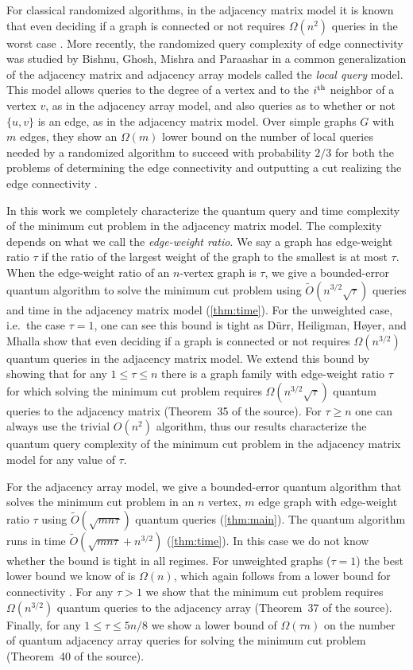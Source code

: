 \documentclass[10pt,a4paper]{article}
\newcommand{\ith}{i^{\scriptsize \mbox{{\rm th}}}}
\newcommand{\tO}{\tilde O}
\newcommand{\1}{\mathbf{1}}
\theoremstyle{definition}
\begin{document}
For classical randomized algorithms, in the adjacency matrix model it is known that even deciding if a graph is connected or not requires $\Omega(n^2)$ queries in the worst case \cite{DHHM06}.
More recently, the randomized query complexity of edge connectivity was studied by Bishnu, Ghosh, Mishra and Paraashar \cite{BGMP20} in a common generalization of the adjacency matrix 
and adjacency array models called the \emph{local query} model.  This model allows queries to the degree of a vertex and to the $\ith$ neighbor of a vertex $v$, 
as in the adjacency array model, and also queries as to whether or not $\{u,v\}$ is an edge, as in the adjacency matrix model.  Over simple graphs $G$ with $m$ edges, they show an 
$\Omega(m)$ lower bound on the number of local queries needed by a randomized algorithm to succeed with probability $2/3$ for both the problems of determining the edge connectivity and 
outputting a cut realizing the edge connectivity \cite[Theorems 2 and 3]{BGMP20}.  

In this work we completely characterize the quantum query and time complexity of the minimum cut problem in the adjacency matrix model.  The complexity depends on what we call 
the \emph{edge-weight ratio}.  We say a graph has edge-weight ratio $\tau$ if the ratio of the largest weight of the graph to the smallest is at most $\tau$.
When the edge-weight ratio of an $n$-vertex graph is $\tau$, we give a bounded-error quantum algorithm to solve the minimum cut problem using $\tilde O(n^{3/2} \sqrt{\tau})$ queries and time 
in the adjacency matrix model (\cref{thm:time}).
For the unweighted case, i.e.\ the case $\tau = 1$, one can see this bound is tight as D\"{u}rr, Heiligman, H{\o}yer, and Mhalla \cite{DHHM06} show that even deciding if a graph is connected or not requires $\Omega(n^{3/2})$ quantum queries 
in the adjacency matrix model.  
We extend this bound by showing that for any $1 \le \tau \le n$ there is a graph family with edge-weight ratio $\tau$ for which solving the minimum cut problem requires $\Omega(n^{3/2} \sqrt{\tau})$ quantum queries to the adjacency matrix 
(Theorem~35 of the source).  For $\tau \ge n$ one can always use the trivial $O(n^2)$ algorithm, thus 
our results characterize the quantum query complexity of the minimum cut problem in the adjacency matrix model for any value of $\tau$.

For the adjacency array model, we give a bounded-error quantum algorithm that solves the minimum cut problem in an $n$ vertex, $m$ edge graph with edge-weight ratio $\tau$ using $\tO(\sqrt{mn\tau})$ quantum queries (\cref{thm:main}).
The quantum algorithm runs in time $\tO(\sqrt{mn\tau} + n^{3/2})$ (\cref{thm:time}).
In this case we do not know whether the bound is tight in all regimes.
For unweighted graphs ($\tau = 1$) the best lower bound we know of is $\Omega(n)$, which again follows from a lower bound for connectivity \cite{DHHM06}.
For any $\tau > 1$ we show that the minimum cut problem requires $\Omega(n^{3/2})$ quantum queries to the adjacency array (Theorem~37 of the source).
Finally, for any $1 \leq \tau \leq 5n/8$ we show a lower bound of $\Omega(\tau n)$ on the number of quantum adjacency array queries for solving the minimum cut problem (Theorem~40 of the source).
\end{document}
